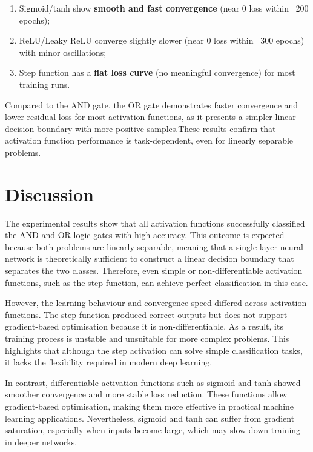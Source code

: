 \documentclass[11pt]{article}
\begin{document}
\begin{enumerate}
    \item Sigmoid/tanh show \textbf{smooth and fast convergence} (near 0 loss within ~200 epochs);
    \item ReLU/Leaky ReLU converge slightly slower (near 0 loss within ~300 epochs) with minor oscillations;
    \item Step function has a \textbf{flat loss curve} (no meaningful convergence) for most training runs.
\end{enumerate}
Compared to the AND gate, the OR gate demonstrates faster convergence and lower residual loss
for most activation functions, as it presents a simpler linear decision boundary with more
positive samples.These results confirm that activation function performance is task-dependent,
even for linearly separable problems.



\section{Discussion}
  The experimental results show that all activation functions successfully classified the AND and OR logic gates with high accuracy. This outcome is expected because both problems are linearly separable, meaning that a single-layer neural network is theoretically sufficient to construct a linear decision boundary that separates the two classes. Therefore, even simple or non-differentiable activation functions, such as the step function, can achieve perfect classification in this case.

However, the learning behaviour and convergence speed differed across activation functions. The step function produced correct outputs but does not support gradient-based optimisation because it is non-differentiable. As a result, its training process is unstable and unsuitable for more complex problems. This highlights that although the step activation can solve simple classification tasks, it lacks the flexibility required in modern deep learning.

In contrast, differentiable activation functions such as sigmoid and tanh showed smoother convergence and more stable loss reduction. These functions allow gradient-based optimisation, making them more effective in practical machine learning applications. Nevertheless, sigmoid and tanh can suffer from gradient saturation, especially when inputs become large, which may slow down training in deeper networks.
\end{document}
